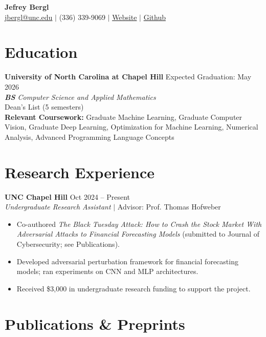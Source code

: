 \documentclass[11pt,letterpaper]{article}
\newcommand{\institution}[1]{\textbf{#1}}
\newcommand{\position}[1]{\textit{#1}}
\newcommand{\dates}[1]{\hfill #1}
\begin{document}
\begin{center}
    {\LARGE\textbf{Jefrey Bergl}} \\[3pt]
    \href{mailto:jbergl@unc.edu}{jbergl@unc.edu} $\mid$ 
    (336) 339-9069 $\mid$ 
    \href{https://jefreybergl.github.io/}{Website} $\mid$
    \href{https://github.com/jefreybergl}{Github}
\end{center}

\vspace{-8pt}

\section{Education}

\institution{University of North Carolina at Chapel Hill} \dates{Expected Graduation: May 2026} \\
\position{\textbf{BS} Computer Science and Applied Mathematics} \\
Dean's List (5 semesters) \\
\textbf{Relevant Coursework:} Graduate Machine Learning, Graduate Computer Vision, Graduate Deep Learning, Optimization for Machine Learning, Numerical Analysis, Advanced Programming Language Concepts

\section{Research Experience}

\institution{UNC Chapel Hill} \dates{Oct 2024 -- Present} \\
\position{Undergraduate Research Assistant} $\mid$ Advisor: Prof. Thomas Hofweber \\[-6pt]
\begin{itemize}
    \item Co-authored \textit{The Black Tuesday Attack: How to Crash the Stock Market With Adversarial Attacks to Financial Forecasting Models} (submitted to Journal of Cybersecurity; see Publications).
    \item Developed adversarial perturbation framework for financial forecasting models; ran experiments on CNN and MLP architectures.
    \item Received \$3,000 in undergraduate research funding to support the project.
\end{itemize}

\section{Publications \& Preprints}
\end{document}
